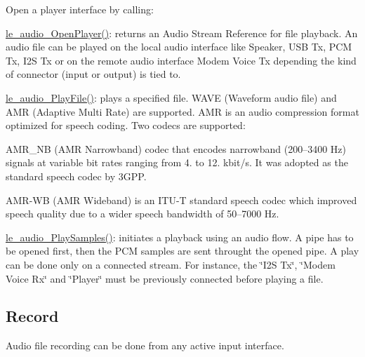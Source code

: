 Open a player interface by calling\+:
\begin{DoxyItemize}
\item \hyperlink{le__audio__interface_8h_a92eb1b6377f50ff07b97c5b8546f01ec}{le\+\_\+audio\+\_\+\+Open\+Player()}\+: returns an Audio Stream Reference for file playback. An audio file can be played on the local audio interface like Speaker, U\+S\+B Tx, P\+C\+M Tx, I2\+S Tx or on the remote audio interface Modem Voice Tx depending the kind of connector (input or output) is tied to.
\item \hyperlink{le__audio__interface_8h_aea2c5d0b394cfab87503639c534300c9}{le\+\_\+audio\+\_\+\+Play\+File()}\+: plays a specified file. W\+A\+V\+E (Waveform audio file) and A\+M\+R (Adaptive Multi Rate) are supported. A\+M\+R is an audio compression format optimized for speech coding. Two codecs are supported\+:
\begin{DoxyItemize}
\item A\+M\+R\+\_\+\+N\+B (A\+M\+R Narrowband) codec that encodes narrowband (200–3400 Hz) signals at variable bit rates ranging from 4. to 12. kbit/s. It was adopted as the standard speech codec by 3\+G\+P\+P.
\item A\+M\+R-\/\+W\+B (A\+M\+R Wideband) is an I\+T\+U-\/\+T standard speech codec which improved speech quality due to a wider speech bandwidth of 50–7000 Hz.
\end{DoxyItemize}
\item \hyperlink{le__audio__interface_8h_afd37d59ab8207338da197554f49d7ff0}{le\+\_\+audio\+\_\+\+Play\+Samples()}\+: initiates a playback using an audio flow. A pipe has to be opened first, then the P\+C\+M samples are sent throught the opened pipe. A play can be done only on a connected stream. For instance, the \char`\"{}\+I2\+S Tx\char`\"{}, \char`\"{}\+Modem Voice Rx\char`\"{} and \char`\"{}\+Player\char`\"{} must be previously connected before playing a file.
\end{DoxyItemize}\hypertarget{c_audio_le_audio_pb_rec}{}\subsection{Record}\label{c_audio_le_audio_pb_rec}
Audio file recording can be done from any active input interface.

